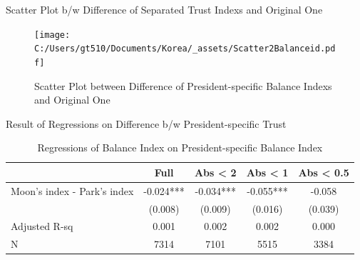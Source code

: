 \documentclass[
  ignorenonframetext,
]{beamer}
\begin{document}
\begin{frame}{Scatter Plot b/w Difference of Separated Trust Indexs and
Original One}
\protect\hypertarget{scatter-plot-bw-difference-of-separated-trust-indexs-and-original-one-1}{}

\begin{figure}
\centering
\texttt{[image: C:/Users/gt510/Documents/Korea/\_assets/Scatter2Balanceid.pdf]}
\caption{Scatter Plot between Difference of President-specific Balance
Indexs and Original One}
\end{figure}

\end{frame}

\begin{frame}{Result of Regressions on Difference b/w President-specific
Trust}
\protect\hypertarget{result-of-regressions-on-difference-bw-president-specific-trust-1}{}

\begin{table}

\caption{\label{tab:kableRegTrustidOnDiff2Balanceid}Regressions of Balance Index on President-specific Balance Index}
\centering
\fontsize{9}{11}\selectfont
\begin{tabular}[t]{lcccc}
\toprule
 & Full & Abs < 2 & Abs < 1 & Abs < 0.5\\
\midrule
Moon's index - Park's index & -0.024*** & -0.034*** & -0.055*** & -0.058\\
 & (0.008) & (0.009) & (0.016) & (0.039)\\
Adjusted R-sq & 0.001 & 0.002 & 0.002 & 0.000\\
N & 7314 & 7101 & 5515 & 3384\\
\bottomrule
\end{tabular}
\end{table}

\end{frame}
\end{document}
